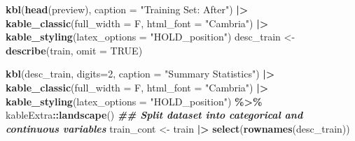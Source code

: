 \documentclass[
]{article}
\newenvironment{Shaded}{\begin{snugshade}}{\end{snugshade}}
\newcommand{\AttributeTok}[1]{\textcolor[rgb]{0.13,0.29,0.53}{#1}}
\newcommand{\ConstantTok}[1]{\textcolor[rgb]{0.56,0.35,0.01}{#1}}
\newcommand{\DecValTok}[1]{\textcolor[rgb]{0.00,0.00,0.81}{#1}}
\newcommand{\DocumentationTok}[1]{\textcolor[rgb]{0.56,0.35,0.01}{\textbf{\textit{#1}}}}
\newcommand{\FunctionTok}[1]{\textcolor[rgb]{0.13,0.29,0.53}{\textbf{#1}}}
\newcommand{\NormalTok}[1]{#1}
\newcommand{\OtherTok}[1]{\textcolor[rgb]{0.56,0.35,0.01}{#1}}
\newcommand{\SpecialCharTok}[1]{\textcolor[rgb]{0.81,0.36,0.00}{\textbf{#1}}}
\newcommand{\StringTok}[1]{\textcolor[rgb]{0.31,0.60,0.02}{#1}}
\begin{document}
\begin{Shaded}
\begin{Highlighting}[]
\FunctionTok{kbl}\NormalTok{(}\FunctionTok{head}\NormalTok{(preview), }\AttributeTok{caption =} \StringTok{"Training Set: After"}\NormalTok{) }\SpecialCharTok{|\textgreater{}}
  \FunctionTok{kable\_classic}\NormalTok{(}\AttributeTok{full\_width =}\NormalTok{ F, }\AttributeTok{html\_font =} \StringTok{"Cambria"}\NormalTok{) }\SpecialCharTok{|\textgreater{}}
  \FunctionTok{kable\_styling}\NormalTok{(}\AttributeTok{latex\_options =} \StringTok{"HOLD\_position"}\NormalTok{)}
\NormalTok{desc\_train }\OtherTok{\textless{}{-}} \FunctionTok{describe}\NormalTok{(train, }\AttributeTok{omit =} \ConstantTok{TRUE}\NormalTok{)}

\FunctionTok{kbl}\NormalTok{(desc\_train, }\AttributeTok{digits=}\DecValTok{2}\NormalTok{, }\AttributeTok{caption =} \StringTok{"Summary Statistics"}\NormalTok{) }\SpecialCharTok{|\textgreater{}}
  \FunctionTok{kable\_classic}\NormalTok{(}\AttributeTok{full\_width =}\NormalTok{ F, }\AttributeTok{html\_font =} \StringTok{"Cambria"}\NormalTok{) }\SpecialCharTok{|\textgreater{}}
  \FunctionTok{kable\_styling}\NormalTok{(}\AttributeTok{latex\_options =} \StringTok{"HOLD\_position"}\NormalTok{)  }\SpecialCharTok{\%\textgreater{}\%}
\NormalTok{  kableExtra}\SpecialCharTok{::}\FunctionTok{landscape}\NormalTok{()}
\DocumentationTok{\#\# Split dataset into categorical and continuous variables}
\NormalTok{train\_cont }\OtherTok{\textless{}{-}}
\NormalTok{  train }\SpecialCharTok{|\textgreater{}}
  \FunctionTok{select}\NormalTok{(}\FunctionTok{rownames}\NormalTok{(desc\_train))}


\end{Highlighting}
\end{Shaded}
\end{document}
